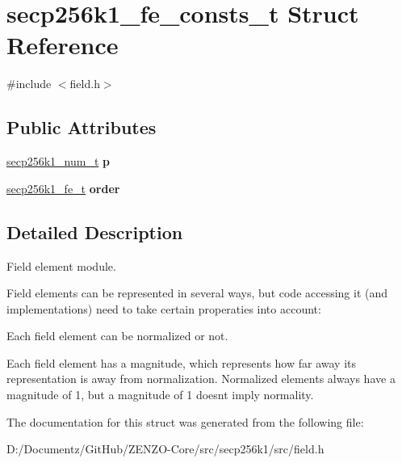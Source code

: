 \hypertarget{structsecp256k1__fe__consts__t}{}\section{secp256k1\+\_\+fe\+\_\+consts\+\_\+t Struct Reference}
\label{structsecp256k1__fe__consts__t}


{\ttfamily \#include $<$field.\+h$>$}

\subsection*{Public Attributes}
\begin{DoxyCompactItemize}
\item 
\mbox{\label{structsecp256k1__fe__consts__t_ae656567993b69f0bb28f674419ff5af6}} 
\mbox{\hyperlink{structsecp256k1__num__t}{secp256k1\+\_\+num\+\_\+t}} {\bfseries p}
\item 
\mbox{\label{structsecp256k1__fe__consts__t_a9c673aff0a37334f7fec58961e7d0696}} 
\mbox{\hyperlink{structsecp256k1__fe__t}{secp256k1\+\_\+fe\+\_\+t}} {\bfseries order}
\end{DoxyCompactItemize}


\subsection{Detailed Description}
Field element module.

Field elements can be represented in several ways, but code accessing it (and implementations) need to take certain properaties into account\+:
\begin{DoxyItemize}
\item Each field element can be normalized or not.
\item Each field element has a magnitude, which represents how far away its representation is away from normalization. Normalized elements always have a magnitude of 1, but a magnitude of 1 doesn\textquotesingle{}t imply normality. 
\end{DoxyItemize}

The documentation for this struct was generated from the following file\+:\begin{DoxyCompactItemize}
\item 
D\+:/\+Documentz/\+Git\+Hub/\+Z\+E\+N\+Z\+O-\/\+Core/src/secp256k1/src/field.\+h\end{DoxyCompactItemize}
